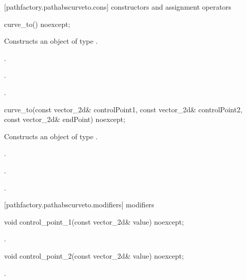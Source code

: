 [pathfactory.pathabscurveto.cons] { constructors and assignment operators}

\begin{itemdecl}
    curve_to() noexcept;
\end{itemdecl}
\begin{itemdescr}
	\pnum
	\effects
	Constructs an object of type .
	
	\pnum
	\postconditions
	.

	.

	.
\end{itemdescr}

\begin{itemdecl}
    curve_to(const vector_2d& controlPoint1, const vector_2d& controlPoint2,
      const vector_2d& endPoint) noexcept;
\end{itemdecl}
\begin{itemdescr}
	\pnum
	\effects
	Constructs an object of type .
	
	\pnum
	\postconditions
	.

	.

	.
\end{itemdescr}

 [pathfactory.pathabscurveto.modifiers]{ modifiers}

\begin{itemdecl}
    void control_point_1(const vector_2d& value) noexcept;
\end{itemdecl}
\begin{itemdescr}
	\pnum
	\postconditions
	.
\end{itemdescr}

\begin{itemdecl}
    void control_point_2(const vector_2d& value) noexcept;
\end{itemdecl}
\begin{itemdescr}
	\pnum
	\postconditions
	.
\end{itemdescr}

